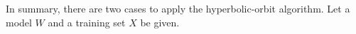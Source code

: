 \documentclass{article}
\theoremstyle{plain}
\theoremstyle{plain} %
\theoremstyle{definition}  %
\theoremstyle{remark}  %
\theoremstyle{plain}
\begin{document}
In summary, there are two cases to apply the hyperbolic-orbit algorithm. Let a model $W$ and a training set $X$ be given.
\begin{itemize}

 

 



\end{itemize}
\end{document}
